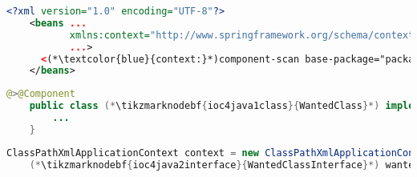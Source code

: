 \example
\begin{lstlisting}[language=XML, title={Configuration XML}]
    <?xml version="1.0" encoding="UTF-8"?>
    <beans ...
           xmlns:context="http://www.springframework.org/schema/context"
           ...>
      <(*\textcolor{blue}{context:}*)component-scan base-package="package.subfolder"/>
    </beans>
\end{lstlisting}
\begin{lstlisting}[language=Java, title={Wanted class}]
    @>@Component
    public class (*\tikzmarknodebf{ioc4java1class}{WantedClass}*) implements (*\tikzmarknodebf{ioc4java1interface}{WantedClassInterface}*) {
        ...
    }
\end{lstlisting}
\begin{lstlisting}[language=Java, title={Usage}]
    ClassPathXmlApplicationContext context = new ClassPathXmlApplicationContext("configurationFile.xml");
    (*\tikzmarknodebf{ioc4java2interface}{WantedClassInterface}*) wantedClassInstance = context.getBean("(*\tikzmarknodebf{ioc4java2beanid}{wantedClass}[ForestGreen]*)", (*\tikzmarknodebf{ioc4java2interface2}{WantedClassInterface}*).class);
\end{lstlisting}
